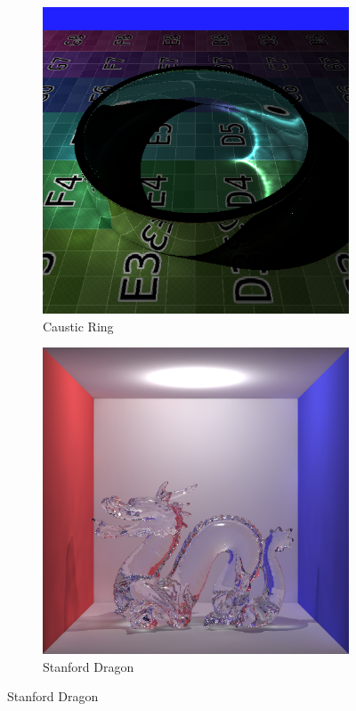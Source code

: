 \begin{figure}
\ContinuedFloat
\centering
	\begin{subfigure}[b]{0.6\textwidth}
	\includegraphics[width=\textwidth]{./images/renders/caustic_ring.png}
	\caption{Caustic Ring}
	\end{subfigure}

	\begin{subfigure}[b]{0.6\textwidth}
	\includegraphics[width=\textwidth]{./images/renders/dragon.png}
	\caption{Stanford Dragon}
	\end{subfigure}
\end{figure}


